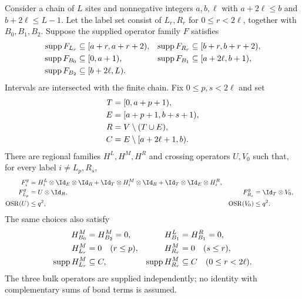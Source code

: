 \begin{lemma}
    \label{thm:three_region_two_window_collars}
    \leanok
    Consider a chain of $L$ sites and nonnegative integers $a,b,\ell$ with
    $a+2\ell\le b$ and $b+2\ell\le L-1$.
    Let the label set consist of $L_r,R_r$ for $0\le r<2\ell$, together
    with $B_0,B_1,B_2$. Suppose the supplied operator family $F$ satisfies
    \begin{align}
        \operatorname{supp}F_{L_r} & \subseteq[a+r,a+r+2),         &
        \operatorname{supp}F_{R_r} & \subseteq[b+r,b+r+2),\notag     \\
        \operatorname{supp}F_{B_0} & \subseteq[0,a+1),             &
        \operatorname{supp}F_{B_1} & \subseteq[a+2\ell,b+1),\notag   \\
        \operatorname{supp}F_{B_2} & \subseteq[b+2\ell,L).
        \label{eq:three_region_window_supports}
    \end{align}
    Intervals are intersected with the finite chain. Fix $0\le p,s<2\ell$
    and set
    \begin{align}
        T & =[0,a+p+1),\notag           \\
        E & =[a+p+1,b+s+1),\notag       \\
        R & =V\setminus(T\cup E),\notag \\
        C & =E\setminus[a+2\ell+1,b).
        \label{eq:three_region_selected_regions}
    \end{align}
    There are regional families $H^L,H^M,H^R$ and crossing operators $U,V_0$
    such that, for every label $i\ne L_p,R_s$,
    \begin{align}
        F_i^g                   & =H_i^L\otimes \Id_E\otimes \Id_R
        +\Id_T\otimes H_i^M\otimes \Id_R
        +\Id_T\otimes \Id_E\otimes H_i^R,\notag                      \\
        F_{L_p}^g               & =U\otimes \Id_R,                 &
        F_{R_s}^g               & =\Id_T\otimes V_0,\notag           \\
        \operatorname{OSR}(U)   & \le q^2,                         &
        \operatorname{OSR}(V_0) & \le q^2.
        \label{eq:three_region_two_window_factors}
    \end{align}
    The same choices also satisfy
    \begin{align}
        H^M_{B_0}                    & =H^M_{B_2}=0,                   &
        H^L_{B_1}                    & =H^R_{B_1}=0,\notag               \\
        H^M_{L_r}                    & =0\quad(r\le p),                &
        H^M_{R_r}                    & =0\quad(s\le r),\notag            \\
        \operatorname{supp}H^M_{L_r} & \subseteq C,                    &
        \operatorname{supp}H^M_{R_r} & \subseteq C\quad(0\le r<2\ell).
        \label{eq:three_region_collar_conditions}
    \end{align}
    The three bulk operators are supplied independently; no identity with
    complementary sums of bond terms is assumed.
\end{lemma}
